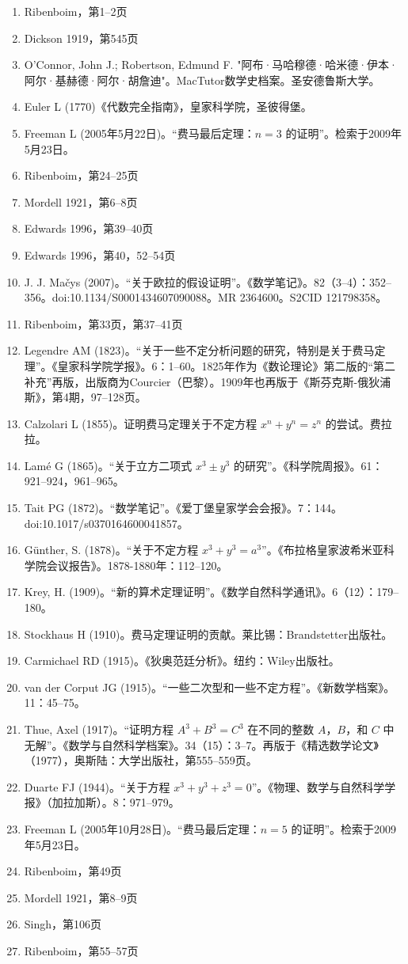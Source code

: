 \begin{enumerate}
\item Ribenboim，第1–2页  
\item Dickson 1919，第545页  
\item O'Connor, John J.; Robertson, Edmund F. "阿布·马哈穆德·哈米德·伊本·阿尔·基赫德·阿尔·胡詹迪"。MacTutor数学史档案。圣安德鲁斯大学。  
\item Euler L (1770)《代数完全指南》，皇家科学院，圣彼得堡。  
\item Freeman L (2005年5月22日)。“费马最后定理：\( n = 3 \) 的证明”。检索于2009年5月23日。  
\item Ribenboim，第24–25页  
\item Mordell 1921，第6–8页  
\item Edwards 1996，第39–40页  
\item Edwards 1996，第40，52–54页  
\item J. J. Mačys (2007)。“关于欧拉的假设证明”。《数学笔记》。82（3–4）：352–356。doi:10.1134/S0001434607090088。MR 2364600。S2CID 121798358。
\item Ribenboim，第33页，第37–41页  
\item Legendre AM (1823)。“关于一些不定分析问题的研究，特别是关于费马定理”。《皇家科学院学报》。6：1–60。1825年作为《数论理论》第二版的“第二补充”再版，出版商为Courcier（巴黎）。1909年也再版于《斯芬克斯-俄狄浦斯》，第4期，97–128页。  
\item Calzolari L (1855)。证明费马定理关于不定方程 \( x^n + y^n = z^n \) 的尝试。费拉拉。  
\item Lamé G (1865)。“关于立方二项式 \( x^3 \pm y^3 \) 的研究”。《科学院周报》。61：921–924，961–965。  
\item Tait PG (1872)。“数学笔记”。《爱丁堡皇家学会会报》。7：144。doi:10.1017/s0370164600041857。  
\item Günther, S. (1878)。“关于不定方程 \( x^3 + y^3 = a^3 \)”。《布拉格皇家波希米亚科学院会议报告》。1878-1880年：112–120。  
\item Krey, H. (1909)。“新的算术定理证明”。《数学自然科学通讯》。6（12）：179–180。  
\item Stockhaus H (1910)。费马定理证明的贡献。莱比锡：Brandstetter出版社。  
\item Carmichael RD (1915)。《狄奥范廷分析》。纽约：Wiley出版社。  
\item van der Corput JG (1915)。“一些二次型和一些不定方程”。《新数学档案》。11：45–75。
\item Thue, Axel (1917)。“证明方程 \( A^3 + B^3 = C^3 \) 在不同的整数 \( A \)，\( B \)，和 \( C \) 中无解”。《数学与自然科学档案》。34（15）：3–7。再版于《精选数学论文》（1977），奥斯陆：大学出版社，第555–559页。  
\item Duarte FJ (1944)。“关于方程 \( x^3 + y^3 + z^3 = 0 \)”。《物理、数学与自然科学学报》（加拉加斯）。8：971–979。  
\item Freeman L (2005年10月28日)。“费马最后定理：\( n = 5 \) 的证明”。检索于2009年5月23日。  
\item Ribenboim，第49页  
\item Mordell 1921，第8–9页  
\item Singh，第106页  
\item Ribenboim，第55–57页
\end{enumerate}